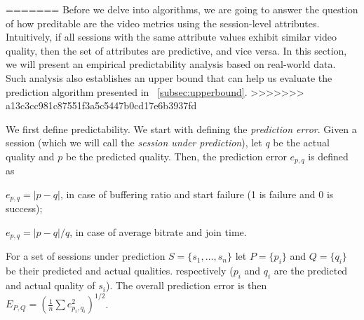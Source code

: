 =======
Before we delve into algorithms, we are going to answer the question of how preditable are the video metrics using the session-level attributes. Intuitively, if all sessions with the same attribute values exhibit similar video quality, then the set of attributes are predictive, and vice versa. In this section, we will present an empirical predictability analysis based on real-world data. Such analysis also establishes an upper bound that can help us evaluate the prediction algorithm presented in \Section~\ref{subsec:upperbound}.
>>>>>>> a13c3cc981c87551f3a5c5447b0cd17e6b3937fd

\label{subsec:upperbound}

We first define predictability. We start with defining the {\it prediction error}.  Given a session
(which we will call the {\it session under prediction}), let $q$ be
the actual quality and $p$ be the predicted quality. Then, the
prediction error $e_{p,q}$ is defined as
\begin{packeditemize}
	\item $e_{p,q}=|p-q|$, in case of buffering ratio and start failure (1 is failure and 0 is success);
	\item $e_{p,q}=|p-q|/q$, in case of average bitrate and join time.
\end{packeditemize}

For a set of sessions under prediction $S=\{s_1,\dots,s_n\}$ let $P=\{p_i\}$ and $Q=\{q_i\}$ be their predicted and actual qualities. respectively ($p_i$ and $q_i$ are the predicted and actual quality of $s_i$). The overall prediction error is then $E_{P,Q}=\left(\frac{1}{n}\sum e_{p_i,q_i}^2\right)^{1/2}$.


